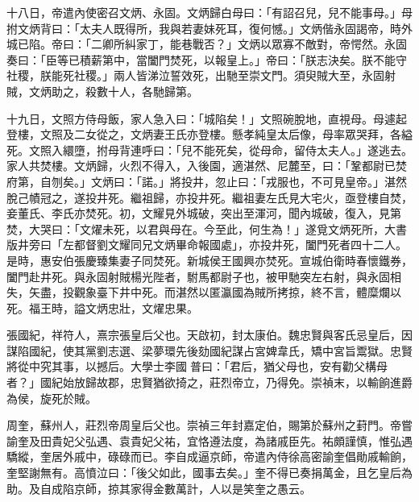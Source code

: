 \begin{pinyinscope}
十八日，帝遣內使密召文炳、永固。文炳歸白母曰：「有詔召兒，兒不能事母。」母拊文炳背曰：「太夫人既得所，我與若妻妹死耳，復何憾。」文炳偕永固謁帝，時外城已陷。帝曰：「二卿所糾家丁，能巷戰否？」文炳以眾寡不敵對，帝愕然。永固奏曰：「臣等已積薪第中，當闔門焚死，以報皇上。」帝曰：「朕志決矣。朕不能守社稷，朕能死社稷。」兩人皆涕泣誓效死，出馳至崇文門。須臾賊大至，永固射賊，文炳助之，殺數十人，各馳歸第。

十九日，文照方侍母飯，家人急入曰：「城陷矣！」文照碗脫地，直視母。母遽起登樓，文照及二女從之，文炳妻王氏亦登樓。懸孝純皇太后像，母率眾哭拜，各縊死。文照入繯墮，拊母背連呼曰：「兒不能死矣，從母命，留侍太夫人。」遂逃去。家人共焚樓。文炳歸，火烈不得入，入後園，適湛然、尼麓至，曰：「鞏都尉已焚府第，自刎矣。」文炳曰：「諾。」將投井，忽止曰：「戎服也，不可見皇帝。」湛然脫己幘冠之，遂投井死。繼祖歸，亦投井死。繼祖妻左氏見大宅火，亟登樓自焚，妾董氏、李氏亦焚死。初，文耀見外城破，突出至渾河，聞內城破，復入，見第焚，大哭曰：「文燿未死，以君與母在。今至此，何生為！」遂覓文炳死所，大書版井旁曰「左都督劉文耀同兄文炳畢命報國處」，亦投井死，闔門死者四十二人。是時，惠安伯張慶臻集妻子同焚死。新城侯王國興亦焚死。宣城伯衛時春懷鐵券，闔門赴井死。與永固射賊楊光陛者，駙馬都尉子也，被甲馳突左右射，與永固相失，矢盡，投觀象臺下井中死。而湛然以匿瀛國為賊所拷掠，終不言，體糜爛以死。福王時，謚文炳忠壯，文燿忠果。

張國紀，祥符人，熹宗張皇后父也。天啟初，封太康伯。魏忠賢與客氏忌皇后，因謀陷國紀，使其黨劉志選、梁夢環先後劾國紀謀占宮婢韋氏，矯中宮旨鬻獄。忠賢將從中究其事，以撼后。大學士李國普曰：「君后，猶父母也，安有勸父構母者？」國紀始放歸故郡，忠賢猶欲掎之，莊烈帝立，乃得免。崇禎末，以輸餉進爵為侯，旋死於賊。

周奎，蘇州人，莊烈帝周皇后父也。崇禎三年封嘉定伯，賜第於蘇州之葑門。帝嘗諭奎及田貴妃父弘遇、袁貴妃父祐，宜恪遵法度，為諸戚臣先。祐頗謹慎，惟弘遇驕縱，奎居外戚中，碌碌而已。李自成逼京師，帝遣內侍徐高密諭奎倡勛戚輸餉，奎堅謝無有。高憤泣曰：「後父如此，國事去矣。」奎不得已奏捐萬金，且乞皇后為助。及自成陷京師，掠其家得金數萬計，人以是笑奎之愚云。


\end{pinyinscope}
